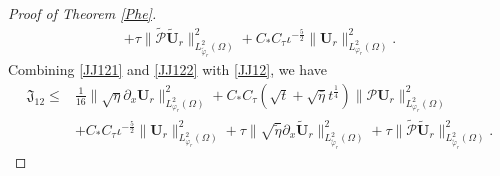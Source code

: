 \documentclass{amsart}
\numberwithin{equation}{section}
\begin{document}
\begin{proof}[Proof of Theorem \ref{Phe}]
\begin{align}
     +\tau\|\tilde{\mathcal{P}}\tilde{\mathbf{U}}_{r}\|_{L_{\tilde{\varphi}_{r}}^{2}(\Omega)}^{2}
     +C_{*}C_{\tau}\iota^{-\frac{5}{2}}\|\mathbf{U}_{r}\|_{L_{\varphi_{r}}^{2}(\Omega)}^{2}.\nonumber
\end{align}
Combining \eqref{JJ121} and \eqref{JJ122} with \eqref{JJ12}, we have
\begin{align}\label{JJ12'}
\mathfrak{J}_{12}
\leq& \frac{1}{16}\|\sqrt{\eta}\partial_{x}\mathbf{U}_{r}\|_{L_{\varphi_{r}}^{2}(\Omega)}^{2}
     +C_{*}C_{\tau}(\sqrt{t}+\sqrt{\bar{\eta}}t^{\frac{1}{4}})\|\mathcal{P}\mathbf{U}_{r}\|_{L_{\varphi_{r}}^{2}(\Omega)}^{2}\\
    &+C_{*}C_{\tau}\iota^{-\frac{5}{2}}\|\mathbf{U}_{r}\|_{L_{\varphi_{r}}^{2}(\Omega)}^{2}
     +\tau\|\sqrt{\tilde{\eta}}\partial_{x}\tilde{\mathbf{U}}_{r}\|_{L_{\tilde{\varphi}_{r}}^{2}(\Omega)}^{2}
     +\tau\|\tilde{\mathcal{P}}\tilde{\mathbf{U}}_{r}\|_{L_{\tilde{\varphi}_{r}}^{2}(\Omega)}^{2}.\nonumber
\end{align}


\end{proof}
\end{document}

